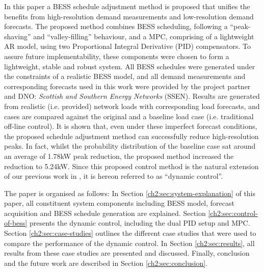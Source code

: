 In this paper a BESS schedule adjustment method is proposed that unifies the benefits from high-resolution demand measurements and low-resolution demand forecasts.
The proposed method combines BESS scheduling, following a ``peak-shaving'' and ``valley-filling'' behaviour, and a MPC, comprising of a lightweight AR model, using two  Proportional Integral Derivative (PID) compensators.
To assure future implementability, these components were chosen to form a lightweight, stable and robust system.
All BESS schedules were generated under the constraints of a realistic BESS model, and all demand measurements and corresponding forecasts used in this work were provided by the project partner and DNO: \textit{Scottish and Southern Energy Networks} (SSEN).
Results are generated from realistic (i.e. provided) network loads with corresponding load forecasts, and cases are compared against the original and a baseline load case (i.e. traditional off-line control).
It is shown that, even under these imperfect forecast conditions, the proposed schedule adjustment method can successfully reduce high-resolution peaks.
In fact, whilst the probability distribution of the baseline case sat around an average of 1.78kW peak reduction, the proposed method increased the reduction to 5.24kW.
Since this proposed control method is the natural extension of our previous work in \cite{Zangs2016}, it is hereon referred to as ``dynamic control''.

The paper is organised as follows:
In Section \ref{ch2:sec:system-explanation} of this paper, all constituent system components including BESS model, forecast acquisition and BESS schedule generation are explained.
Section \ref{ch2:sec:control-of-bess} presents the dynamic control, including the dual PID setup and MPC.
Section \ref{ch2:sec:case-studies} outlines the different case studies that were used to compare the performance of the dynamic control.
In Section \ref{ch2:sec:results}, all results from these case studies are presented and discussed.
Finally, conclusion and the future work are described in Section \ref{ch2:sec:conclusion}.










